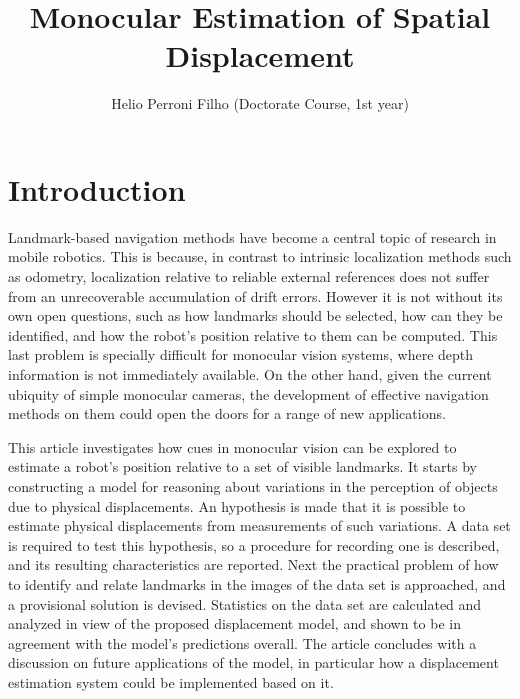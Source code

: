 \documentclass[twocolumn, 9pt]{jsproceedings}
\title{Monocular Estimation of Spatial Displacement}
\author{Helio Perroni Filho (Doctorate Course, 1st year)\authorrefmark{1}}
\affiliation{Intelligent Robotics Laboratory, OHYA's group}
\begin{document}
\thispagestyle{myheadings}
\maketitle


\section{Introduction}

Landmark-based navigation methods have become a central topic of research in mobile robotics. This is because, in contrast to intrinsic localization methods such as odometry, localization relative to reliable external references does not suffer from an unrecoverable accumulation of drift errors. However it is not without its own open questions, such as how landmarks should be selected, how can they be identified, and how the robot's position relative to them can be computed. This last problem is specially difficult for monocular vision systems, where depth information is not immediately available. On the other hand, given the current ubiquity of simple monocular cameras, the development of effective navigation methods on them could open the doors for a range of new applications.

This article investigates how cues in monocular vision can be explored to estimate a robot's position relative to a set of visible landmarks. It starts by constructing a model for reasoning about variations in the perception of objects due to physical displacements. An hypothesis is made that it is possible to estimate physical displacements from measurements of such variations. A data set is required to test this hypothesis, so a procedure for recording one is described, and its resulting characteristics are reported. Next the practical problem of how to identify and relate landmarks in the images of the data set is approached, and a provisional solution is devised. Statistics on the data set are calculated and analyzed in view of the proposed displacement model, and shown to be in agreement with the model's predictions overall. The article concludes with a discussion on future applications of the model, in particular how a displacement estimation system could be implemented based on it.
\end{document}
